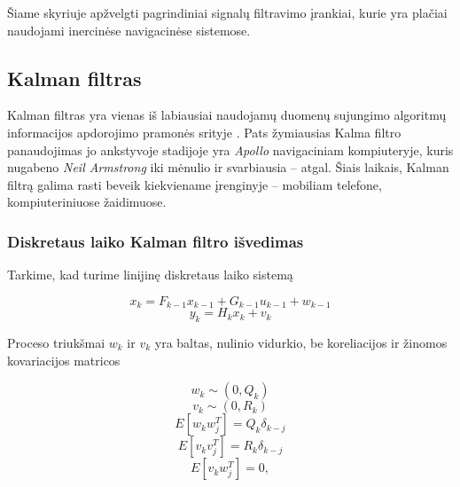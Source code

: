 Šiame skyriuje apžvelgti pagrindiniai signalų filtravimo įrankiai, kurie yra plačiai naudojami inercinėse navigacinėse sistemose.

\subsection{Kalman filtras}

    Kalman filtras \cite{kalman1960new} yra vienas iš labiausiai naudojamų duomenų sujungimo algoritmų informacijos apdorojimo pramonės srityje \cite{faragher2012understanding}. Pats žymiausias Kalma filtro panaudojimas jo ankstyvoje stadijoje yra \textit{Apollo} navigaciniam kompiuteryje, kuris nugabeno \textit{Neil Armstrong} iki mėnulio ir svarbiausia -- atgal. Šiais laikais, Kalman filtrą galima rasti beveik kiekviename įrenginyje -- mobiliam telefone, kompiuteriniuose žaidimuose.

    \subsubsection{Diskretaus laiko Kalman filtro išvedimas}

    Tarkime, kad turime linijinę diskretaus laiko sistemą

    \begin{equation}
        x_k = F_{k-1}x_{k-1} + G_{k-1}u_{k-1} + w_{k-1}
    \end{equation}
    \begin{equation}
        y_k = H_k x_k + v_k
    \end{equation}

    Proceso triukšmai ${w_k}$ ir ${v_k}$ yra baltas, nulinio vidurkio, be koreliacijos ir žinomos kovariacijos matricos

    \begin{equation}
    w_k \sim (0, Q_k)
    \end{equation}
    \begin{equation}
    v_k \sim (0, R_k)
    \end{equation}
    \begin{equation}
    E[w_k w_j^T] = Q_k \delta_{k-j}
    \end{equation}
    \begin{equation}
    E[v_k v_j^T] = R_k\delta_{k-j}
    \end{equation}
    \begin{equation}
    E[v_k w_j^T] = 0,
    \end{equation}
    
